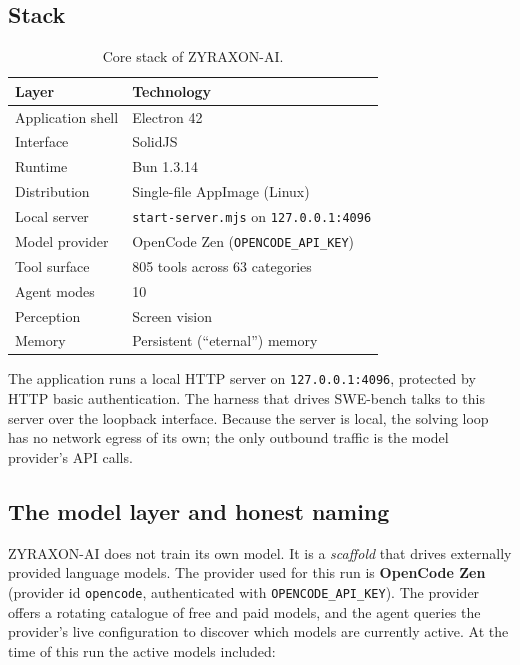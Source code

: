\documentclass[11pt,a4paper]{article}
\begin{document}
\subsection{Stack}

\begin{table}[H]
\centering
\caption{Core stack of ZYRAXON-AI.}
\label{tab:stack}
\begin{tabular}{@{}ll@{}}
\toprule
Layer & Technology \\
\midrule
Application shell & Electron 42 \\
Interface & SolidJS \\
Runtime & Bun 1.3.14 \\
Distribution & Single-file AppImage (Linux) \\
Local server & \texttt{start-server.mjs} on \texttt{127.0.0.1:4096} \\
Model provider & OpenCode Zen (\texttt{OPENCODE\_API\_KEY}) \\
Tool surface & 805 tools across 63 categories \\
Agent modes & 10 \\
Perception & Screen vision \\
Memory & Persistent (``eternal'') memory \\
\bottomrule
\end{tabular}
\end{table}

The application runs a local HTTP server on \texttt{127.0.0.1:4096}, protected by HTTP
basic authentication. The harness that drives SWE-bench talks to this server over the
loopback interface. Because the server is local, the solving loop has no network egress
of its own; the only outbound traffic is the model provider's API calls.

\subsection{The model layer and honest naming}

ZYRAXON-AI does not train its own model. It is a \emph{scaffold} that drives externally
provided language models. The provider used for this run is \textbf{OpenCode Zen}
(provider id \texttt{opencode}, authenticated with \texttt{OPENCODE\_API\_KEY}). The
provider offers a rotating catalogue of free and paid models, and the agent queries the provider's live
configuration to discover which models are currently active. At the time of this run the
active models included:
\end{document}
